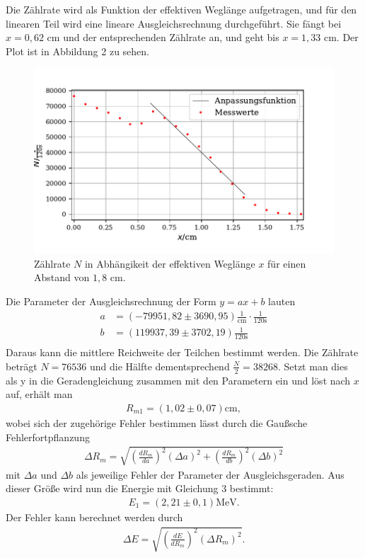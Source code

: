 \noindent Die Zählrate wird als Funktion der effektiven Weglänge aufgetragen, und für den linearen Teil wird eine lineare Ausgleichsrechnung durchgeführt. 
Sie fängt bei $x=0,62$ $\si{\cm}$ und der entsprechenden Zählrate an, und geht bis $x=1,33$ $\si{\cm}$.
Der Plot ist in Abbildung 2 zu sehen.
\begin{figure}[H]
  \centering
  \includegraphics{plot1.pdf}
  \caption{Zählrate $N$ in Abhängikeit der effektiven Weglänge $x$ für einen Abstand von $1,8$ $\si{\cm}$. }
  \label{fig:plot}
\end{figure}

\noindent Die Parameter der Ausgleichsrechnung der Form $y=ax+b$ lauten
\begin{align*}
a &=  (-79951,82 \pm 3690,95) \frac{1}{\si{\centi\meter}}\cdot \frac{1}{120\si{\second}} \\
b &= (119937,39 \pm 3702,19) \frac{1}{120\si{\second}} \\
\end{align*}
Daraus kann die mittlere Reichweite der Teilchen bestimmt werden. Die Zählrate beträgt $N=76536$ und die Hälfte dementsprechend $\frac{N}{2}=38268$. Setzt man dies als y in die Geradengleichung zusammen mit den Parametern ein und löst nach $x$ auf, erhält man
\begin{align*}
R_{m1} = (1,02 \pm 0,07) \si{\centi\meter}, %
\end{align*}
wobei sich der zugehörige Fehler bestimmen lässt durch die Gaußsche Fehlerfortpflanzung
\begin{align*}
\Delta R_{m} = \sqrt{(\frac{dR_m}{da})^2 (\Delta a)^2 + (\frac{dR_m}{db})^2 (\Delta b)^2}
\end{align*}
mit $\Delta a $ und $\Delta b$ als jeweilige Fehler der Parameter der Ausgleichsgeraden.
Aus dieser Größe wird nun die Energie mit Gleichung 3 bestimmt:
\begin{align*}
E_{1} = (2,21 \pm 0,1) \si{\MeV}.
\end{align*}
Der Fehler kann berechnet werden durch
\begin{align*}
\Delta E = \sqrt{(\frac{dE}{dR_m})^2 (\Delta R_m)^2 }.
\end{align*}


